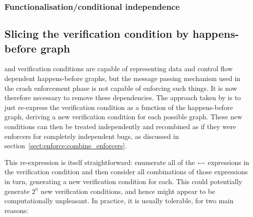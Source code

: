 
\subsubsection{Functionalisation/conditional independence}






\subsection{Slicing the verification condition by happens-before graph}
\label{sect:enforce:slice_hb_graph}

{\StateMachines} and verification conditions are capable of
representing data and control flow dependent happens-before graphs,
but the message passing mechanism used in the crash enforcement phase
is not capable of enforcing such things.  It is now therefore
necessary to remove these dependencies.  The approach taken by
{\implementation} is to just re-express the verification condition as
a function of the happens-before graph, deriving a new verification
condition for each possible graph.  These new conditions can then be
treated independently and recombined as if they were enforcers for
completely independent bugs, as discussed in
section~\ref{sect:enforce:combine_enforcers}.

This re-expression is itself straightforward: enumerate all of the
$\leftarrowtail$ expressions in the verification condition and then
consider all combinations of those expressions in turn, generating a
new verification condition for each.  This could potentially generate
$2^n$ new verification conditions, and hence might appear to be
computationally unpleasant.  In practice, it is usually tolerable, for
two main reasons:

